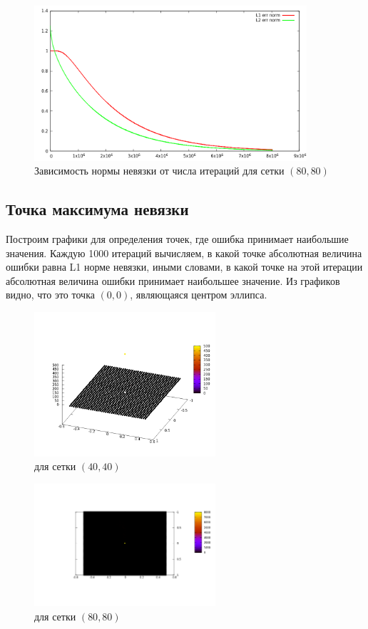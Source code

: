 \documentclass[oneside,final,14pt]{extreport}
\begin{document}
\begin{figure}[h!]
  \centering
  \includegraphics[width=0.9\textwidth]{picture7}
  \caption{Зависимость нормы невязки от числа итераций для сетки \((80, 80)\)}
\end{figure}

\newpage
\subsection{Точка максимума невязки}
\noindent
Построим графики для определения точек, где ошибка принимает наибольшие
значения. Каждую 1000 итераций вычисляем, в какой точке абсолютная
величина ошибки равна L1 норме невязки, иными словами, в какой точке
на этой итерации абсолютная величина ошибки принимает наибольшее значение.
Из графиков видно, что это точка \((0,0)\), являющаяся центром эллипса.
\begin{figure}[ht!]
  \centering
  \includegraphics[width=0.6\textwidth]{picture8}
  \caption{для сетки \((40, 40)\)}
\end{figure}

\begin{figure}[h!]
  \centering
  \includegraphics[width=0.6\textwidth]{picture9}
  \caption{для сетки \((80, 80)\)}
\end{figure}
\end{document}
